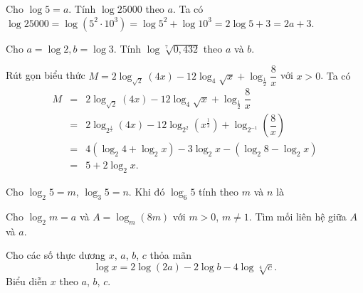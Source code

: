 \begin{vd}
	Cho $\log5=a$. Tính $\log25000$ theo $a$.
	\loigiai
	{
		Ta có $\log25000=\log(5^2\cdot 10^3)=\log5^2+\log10^3=2\log5+3=2a+3$.
	}
\end{vd}
\begin{vd}
	Cho $a=\log 2, b=\log 3$. Tính $\log \sqrt[7]{0{,}432}$  theo $a$ và  $b$. 
\end{vd}
\begin{vd}
	Rút gọn biểu thức $M=2\log_{\sqrt{2}}(4x)-12\log_4\sqrt{x}+\log_{\tfrac{1}{2}}\dfrac{8}{x}$ với $x>0$.
	\loigiai
	{Ta có \begin{eqnarray*}
			M&=&2\log_{\sqrt{2}}(4x)-12\log_4\sqrt{x}+\log_{\tfrac{1}{2}}\dfrac{8}{x}\\
			&=&2\log_{2^\frac{1}{2}} (4x)-12\log_{2^2}\left(x^\frac{1}{2}\right)+\log_{2^{-1}}\left(\dfrac{8}{x}\right)\\
			&=&4\left(\log_2 4+\log_2 x\right)-3\log_2 x-\left(\log_2 8-\log_2 x\right)\\
			&=&5+2\log_2 x.
		\end{eqnarray*}
	}
\end{vd}
\begin{vd}
	Cho $\log_2 5=m$, $\log_3 5=n$. Khi đó $\log_6 5$ tính theo $m$ và $n$ là
\end{vd}
\begin{vd}
	Cho $\log_{2}m=a$ và $A=\log_{m} \left(8m\right)$ với $m>0$, $m\ne 1$. Tìm mối liên hệ giữa $A$ và $a$.
\end{vd}
\begin{vd}
	Cho các số thực dương $x$, $a$, $b$, $c$ thỏa mãn $$\log x = 2 \log(2a) - 2 \log b - 4 \log \sqrt[4]{c}.$$ Biểu diễn $x$ theo $a$, $b$, $c$.
\end{vd}
